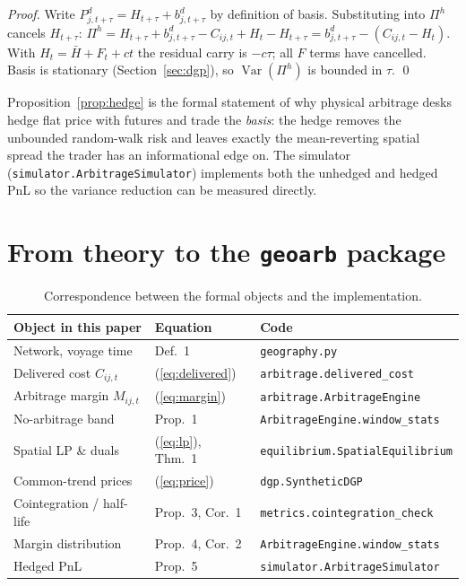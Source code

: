 \documentclass[11pt]{article}
\theoremstyle{definition}
\theoremstyle{plain}
\newcommand{\Var}{\operatorname{Var}}
\begin{document}
\begin{proof}
Write $P^d_{j,t+\tau}=H_{t+\tau}+b^d_{j,t+\tau}$ by definition of basis.
Substituting into $\Pi^h$ cancels $H_{t+\tau}$:
$\Pi^h=H_{t+\tau}+b^d_{j,t+\tau}-C_{ij,t}+H_t-H_{t+\tau}
=b^d_{j,t+\tau}-(C_{ij,t}-H_t)$. With $H_t=\bar H+F_t+ct$ the residual carry is
$-c\tau$; all $F$ terms have cancelled. Basis is stationary
(Section~\ref{sec:dgp}), so $\Var(\Pi^h)$ is bounded in $\tau$. \qed
\end{proof}

Proposition~\ref{prop:hedge} is the formal statement of why physical arbitrage
desks hedge flat price with futures and trade the \emph{basis}: the hedge
removes the unbounded random-walk risk and leaves exactly the mean-reverting
spatial spread the trader has an informational edge on. The simulator
(\texttt{simulator.ArbitrageSimulator}) implements both the unhedged and hedged
PnL so the variance reduction can be measured directly.

\section{From theory to the \texttt{geoarb} package}
\label{sec:map}

\begin{table}[h]
\centering
\small
\begin{tabular}{@{}lll@{}}
\toprule
\textbf{Object in this paper} & \textbf{Equation} & \textbf{Code} \\
\midrule
Network, voyage time & Def.~1 & \texttt{geography.py} \\
Delivered cost $C_{ij,t}$ & (\ref{eq:delivered}) & \texttt{arbitrage.delivered\_cost} \\
Arbitrage margin $M_{ij,t}$ & (\ref{eq:margin}) & \texttt{arbitrage.ArbitrageEngine} \\
No-arbitrage band & Prop.~1 & \texttt{ArbitrageEngine.window\_stats} \\
Spatial LP \& duals & (\ref{eq:lp}), Thm.~1 & \texttt{equilibrium.SpatialEquilibrium} \\
Common-trend prices & (\ref{eq:price}) & \texttt{dgp.SyntheticDGP} \\
Cointegration / half-life & Prop.~3, Cor.~1 & \texttt{metrics.cointegration\_check} \\
Margin distribution & Prop.~4, Cor.~2 & \texttt{ArbitrageEngine.window\_stats} \\
Hedged PnL & Prop.~5 & \texttt{simulator.ArbitrageSimulator} \\
\bottomrule
\end{tabular}
\caption{Correspondence between the formal objects and the implementation.}
\end{table}
\end{document}
